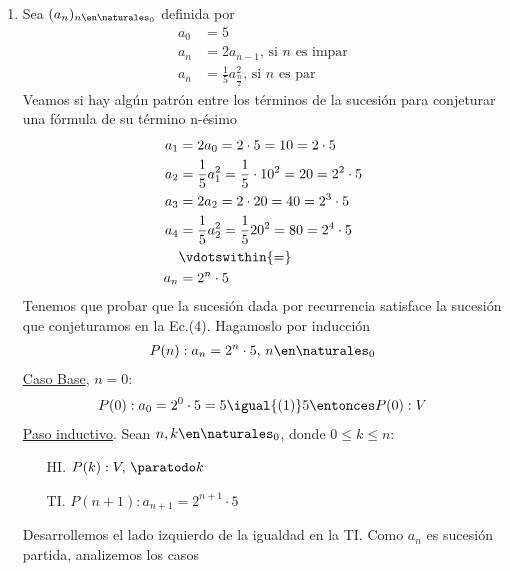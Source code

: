\begin{enumerate}[label=\roman*)]
  \item Sea $(a_n)_{n \en \naturales_0}$ definida por
        \setcounter{equation}{0}
        \begin{align}
          a_0 & = 5                                                      \\
          a_n & = 2a_{n-1},\, \text{si $n$ es impar}                     \\
          a_n & =   \frac{1}{5}a^2_{\frac{n}{2}},\, \text{si $n$ es par}
        \end{align}
        Veamos si hay algún patrón entre los términos de la sucesión para conjeturar una fórmula de su término
        n-ésimo
        \begin{align}
          a_1 & = 2 a_0 = 2 \cdot 5 = 10 = 2 \cdot 5 \nonumber                            \\
          a_2 & = \frac{1}{5} a_1^2 = \frac{1}{5} \cdot 10^2 = 20 = 2^2 \cdot 5 \nonumber \\
          a_3 & = 2 a_2 = 2 \cdot 20 = 40 = 2^3 \cdot 5 \nonumber                         \\
          a_4 & = \frac{1}{5} a_2^2 = \frac{1}{5} 20^2 = 80 = 2^4 \cdot 5 \nonumber       \\
              & \vdotswithin{=} \nonumber                                                 \\
          a_n & = 2^n \cdot 5
        \end{align}
        Tenemos que probar que la sucesión dada por recurrencia satisface la sucesión que conjeturamos en la Ec.(4).
        Hagamoslo por inducción
        \begin{align*}
          P(n): a_n = 2^n \cdot 5,\, n \en \naturales _0
        \end{align*}
        \underline{Caso Base}, $n = 0$:
        \begin{align*}
          P(0): a_0 = 2^0 \cdot 5 = 5 \igual{(1)} 5 \entonces P(0):V \\
        \end{align*}
        \underline{Paso inductivo}. Sean $n,k \en \naturales _0$, donde $0 \leq k \leq n$:
        \begin{enumerate}
          \item[HI.] $P(k):V,\, \paratodo k$
          \item[TI.] $P(n+1): a_{n+1} = 2^{n+1} \cdot 5$
        \end{enumerate}
        Desarrollemos el lado izquierdo de la igualdad en la TI. Como $a_{n}$ es sucesión partida, analizemos los casos

\end{enumerate}
